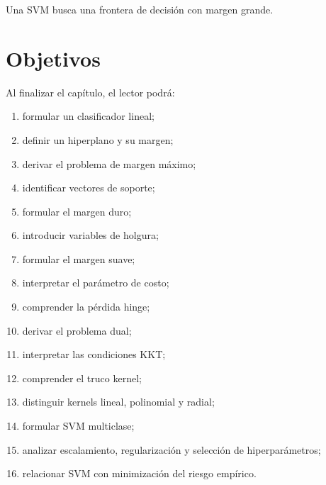 \documentclass[
  spanish,
  10.5pt,
  letterpaper,
  DIV=11,
  numbers=noendperiod,
  oneside,
  open=any]{scrreprt}
\providecommand{\tightlist}{%
  \setlength{\itemsep}{0pt}\setlength{\parskip}{0pt}}
\theoremstyle{definition}
\theoremstyle{definition}
\theoremstyle{plain}
\theoremstyle{remark}
\begin{document}
\begin{tcolorbox}[enhanced jigsaw, arc=.35mm, bottomrule=.15mm, bottomtitle=1mm, breakable, colback=white, colbacktitle=quarto-callout-important-color!10!white, colframe=quarto-callout-important-color-frame, coltitle=black, left=2mm, leftrule=.75mm, opacityback=0, opacitybacktitle=0.6, rightrule=.15mm, title=\textcolor{quarto-callout-important-color}{\faExclamation}\hspace{0.5em}{Definición esencial}, titlerule=0mm, toprule=.15mm, toptitle=1mm]

Una SVM busca una frontera de decisión con margen grande.

\end{tcolorbox}

\section*{Objetivos}\label{objetivos-14}


Al finalizar el capítulo, el lector podrá:

\begin{enumerate}
\def\labelenumi{\arabic{enumi}.}
\tightlist
\item
  formular un clasificador lineal;
\item
  definir un hiperplano y su margen;
\item
  derivar el problema de margen máximo;
\item
  identificar vectores de soporte;
\item
  formular el margen duro;
\item
  introducir variables de holgura;
\item
  formular el margen suave;
\item
  interpretar el parámetro de costo;
\item
  comprender la pérdida hinge;
\item
  derivar el problema dual;
\item
  interpretar las condiciones KKT;
\item
  comprender el truco kernel;
\item
  distinguir kernels lineal, polinomial y radial;
\item
  formular SVM multiclase;
\item
  analizar escalamiento, regularización y selección de hiperparámetros;
\item
  relacionar SVM con minimización del riesgo empírico.
\end{enumerate}
\end{document}
